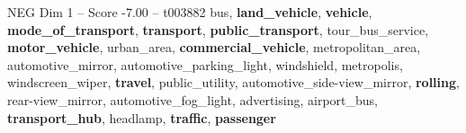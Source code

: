 \begin{textsample}{NEG Dim 1 – Score -7.00 – t003882}  \label{ex:f1_neg_003}
bus, \textbf{land\_vehicle}, \textbf{vehicle}, \textbf{mode\_of\_transport}, \textbf{transport}, \textbf{public\_transport}, tour\_bus\_service, \textbf{motor\_vehicle}, urban\_area, \textbf{commercial\_vehicle}, metropolitan\_area, automotive\_mirror, automotive\_parking\_light, windshield, metropolis, windscreen\_wiper, \textbf{travel}, public\_utility, automotive\_side-view\_mirror, \textbf{rolling}, rear-view\_mirror, automotive\_fog\_light, advertising, airport\_bus, \textbf{transport\_hub}, headlamp, \textbf{traffic}, \textbf{passenger}

\end{textsample}
